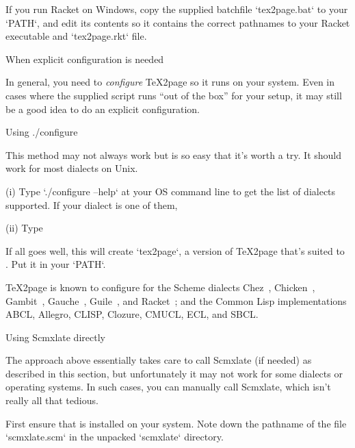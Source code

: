 If you run Racket on Windows,
copy the supplied batchfile `tex2page.bat`
to your `PATH`, and edit its contents so it contains
the correct pathnames to your Racket executable and
`tex2page.rkt` file.


\beginsection When explicit configuration is needed

In general, you need to {\em
configure}
\TeX2page so it runs on your system.  Even in cases where the supplied
script runs “out of the box” for your setup, it may still be a good
idea to do an explicit configuration.

\beginsection Using {./configure}

This method may not always work but is so easy that
it’s worth a try.  It should work for most
dialects on Unix.

\item(i) Type `./configure --help` at your OS command line
to get the list of dialects supported.
If your dialect  is one of them,

\item(ii) Type  

\n If all goes well, this will create
`tex2page`, a version of \TeX2page that’s suited to .
Put it in your `PATH`.

\TeX2page is known to configure for the Scheme dialects
Chez~\cite{chez},
Chicken~\cite{chicken},
Gambit~\cite{gambit},
Gauche~\cite{gauche},
Guile~\cite{guile},
and Racket~\cite{racket}; and the Common Lisp
implementations ABCL, Allegro, CLISP, Clozure, CMUCL, ECL, and SBCL.
\iffalse how about bigloo mitscheme pocketscheme s48 scm scsh
stklos sxm \fi

\beginsection  Using Scmxlate directly

The  approach above
essentially takes care to call Scmxlate (if needed) as described in
this section, but unfortunately it may not work for
some dialects or operating systems.  In such cases, you
can manually call Scmxlate, which isn’t really all that
tedious.

First ensure that
is installed on your system.  Note down the pathname of
the file `scmxlate.scm` in the unpacked `scmxlate`
directory.

